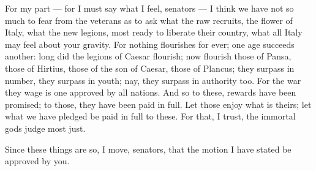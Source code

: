  For my part --- for I must say what I feel, senators --- I think we have not so much to fear from the veterans as to ask what the raw recruits, the flower of Italy, what the new legions, most ready to liberate their country, what all Italy may feel about your gravity. For nothing flourishes for ever; one age succeeds another: long did the legions of Caesar flourish; now flourish those of Pansa, those of Hirtius, those of the son of Caesar, those of Plancus; they surpass in number, they surpass in youth; nay, they surpass in authority too. For the war they wage is one approved by all nations. And so to these, rewards have been promised; to those, they have been paid in full. Let those enjoy what is theirs; let what we have pledged be paid in full to these. For that, I trust, the immortal gods judge most just.

 Since these things are so, I move, senators, that the motion I have stated be approved by you.
